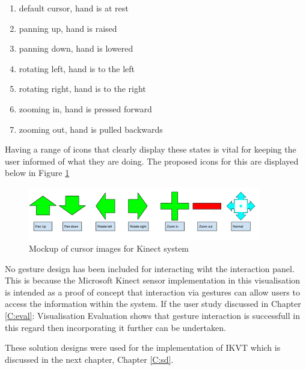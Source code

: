 \begin{enumerate}
\begin{enumerate}
 \item default cursor, hand is at rest
 \item panning up, hand is raised
 \item panning down, hand is lowered
 \item rotating left, hand is to the left
 \item rotating right, hand is to the right
 \item zooming in, hand is pressed forward
 \item zooming out, hand is pulled backwards
\end{enumerate}
Having a range of icons that clearly display these states is vital for keeping
the user informed of what they are doing. The proposed icons for this are
displayed below in Figure \ref{fig:cursors}
\begin{figure}[H]
  \centering
      \includegraphics[width=0.9\textwidth]{images/curserImages.png}
  \caption{Mockup of cursor images for Kinect system}  
  \label{fig:cursors}
\end{figure}

No gesture design has been included for interacting wiht the interaction panel.
This is because the Microsoft Kinect sensor implementation in this visualisation
is intended as a proof of concept that interaction via gestures can allow users
to access the information within the system. If the user study discussed in
Chapter \ref{C:eval}: Visualisation Evaluation shows that gesture interaction is
successfull in this regard then incorporating it further can be undertaken.
\end{enumerate}

These solution designs were used for the implementation of IKVT which is discussed in the next chapter, Chapter \ref{C:sd}.
